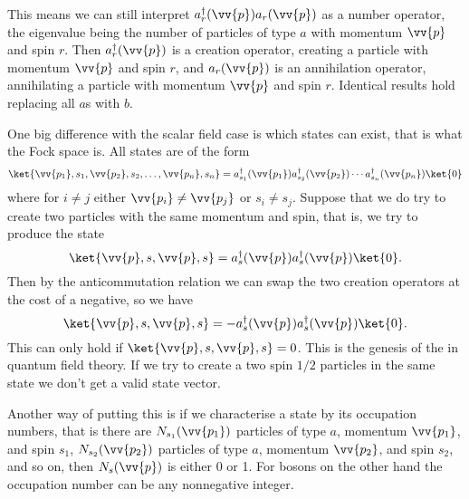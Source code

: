 \documentclass[fleqn]{NotesClass}
\newcommand{\hermit}{{\dagger}}
\begin{document}
    This means we can still interpret \(a_r^\hermit(\vv{p})a_r(\vv{p})\) as a number operator, the eigenvalue being the number of particles of type \(a\) with momentum \(\vv{p}\) and spin \(r\).
    Then \(a^\hermit_r(\vv{p})\) is a creation operator, creating a particle with momentum \(\vv{p}\) and spin \(r\), and \(a_r(\vv{p})\) is an annihilation operator, annihilating a particle with momentum \(\vv{p}\) and spin \(r\).
    Identical results hold replacing all \(a\)s with \(b\).
    
    One big difference with the scalar field case is which states can exist, that is what the Fock space is.
    All states are of the form
    \begin{equation}
        \ket{\vv{p_1}, s_1, \vv{p_2}, s_2, \dotsc, \vv{p_n}, s_n} = a_{s_1}^\hermit(\vv{p_1}) a_{s_2}^\hermit(\vv{p_2}) \dotsm a_{s_n}^\hermit(\vv{p_n}) \ket{0}
    \end{equation}
    where for \(i \ne j\) either \(\vv{p_i} \ne \vv{p_j}\) or \(s_i \ne s_j\).
    Suppose that we do try to create two particles with the same momentum and spin, that is, we try to produce the state
    \begin{equation}
        \ket{\vv{p}, s, \vv{p}, s} = a_s^\hermit(\vv{p})a_s^\hermit(\vv{p})\ket{0}.
    \end{equation}
    Then by the anticommutation relation we can swap the two creation operators at the cost of a negative, so we have
    \begin{equation}
        \ket{\vv{p}, s, \vv{p}, s} = -a_s^\hermit(\vv{p})a_s^\hermit(\vv{p})\ket{0}.
    \end{equation}
    This can only hold if \(\ket{\vv{p}, s, \vv{p}, s} = 0\).
    This is the genesis of the  in quantum field theory.
    If we try to create a two spin \(1/2\) particles in the same state we don't get a valid state vector.
    
    Another way of putting this is if we characterise a state by its occupation numbers, that is there are \(N_{s_1}(\vv{p_1})\) particles of type \(a\), momentum \(\vv{p_1}\), and spin \(s_1\), \(N_{s_2}(\vv{p_2})\) particles of type \(a\), momentum \(\vv{p_2}\), and spin \(s_2\), and so on, then \(N_s(\vv{p})\) is either 0 or 1.
    For bosons on the other hand the occupation number can be any nonnegative integer.
    
\end{document}
